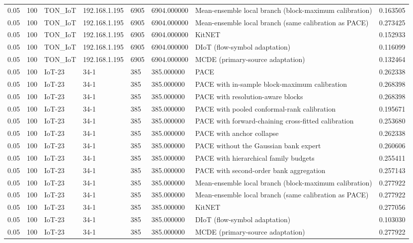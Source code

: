 \begin{tabular}{llllllll}
0.05 & 100 & TON\_IoT & 192.168.1.195 & 6905 & 6904.000000 & Mean-ensemble local branch (block-maximum calibration) & 0.163505 \\
0.05 & 100 & TON\_IoT & 192.168.1.195 & 6905 & 6904.000000 & Mean-ensemble local branch (same calibration as PACE) & 0.273425 \\
0.05 & 100 & TON\_IoT & 192.168.1.195 & 6905 & 6904.000000 & KitNET & 0.152933 \\
0.05 & 100 & TON\_IoT & 192.168.1.195 & 6905 & 6904.000000 & DIoT (flow-symbol adaptation) & 0.116099 \\
0.05 & 100 & TON\_IoT & 192.168.1.195 & 6905 & 6904.000000 & MCDE (primary-source adaptation) & 0.132464 \\
0.05 & 100 & IoT-23 & 34-1 & 385 & 385.000000 & PACE & 0.262338 \\
0.05 & 100 & IoT-23 & 34-1 & 385 & 385.000000 & PACE with in-sample block-maximum calibration & 0.268398 \\
0.05 & 100 & IoT-23 & 34-1 & 385 & 385.000000 & PACE with resolution-aware blocks & 0.268398 \\
0.05 & 100 & IoT-23 & 34-1 & 385 & 385.000000 & PACE with pooled conformal-rank calibration & 0.195671 \\
0.05 & 100 & IoT-23 & 34-1 & 385 & 385.000000 & PACE with forward-chaining cross-fitted calibration & 0.253680 \\
0.05 & 100 & IoT-23 & 34-1 & 385 & 385.000000 & PACE with anchor collapse & 0.262338 \\
0.05 & 100 & IoT-23 & 34-1 & 385 & 385.000000 & PACE without the Gaussian bank expert & 0.260606 \\
0.05 & 100 & IoT-23 & 34-1 & 385 & 385.000000 & PACE with hierarchical family budgets & 0.255411 \\
0.05 & 100 & IoT-23 & 34-1 & 385 & 385.000000 & PACE with second-order bank aggregation & 0.257143 \\
0.05 & 100 & IoT-23 & 34-1 & 385 & 385.000000 & Mean-ensemble local branch (block-maximum calibration) & 0.277922 \\
0.05 & 100 & IoT-23 & 34-1 & 385 & 385.000000 & Mean-ensemble local branch (same calibration as PACE) & 0.277922 \\
0.05 & 100 & IoT-23 & 34-1 & 385 & 385.000000 & KitNET & 0.277056 \\
0.05 & 100 & IoT-23 & 34-1 & 385 & 385.000000 & DIoT (flow-symbol adaptation) & 0.103030 \\
0.05 & 100 & IoT-23 & 34-1 & 385 & 385.000000 & MCDE (primary-source adaptation) & 0.277922 \\

\end{tabular}
